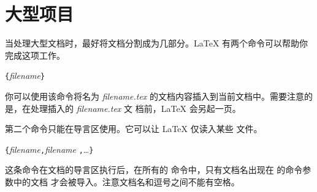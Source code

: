 %
%



%

\section{大型项目}

当处理大型文档时，最好将文档分割成为几部分。\LaTeX{} 有两个命令可以帮助你完成这项工作。

\begin{lscommand}
\verb|{|\emph{filename}\verb|}|
\end{lscommand}
\noindent %
你可以使用该命令将名为 \emph{filename.tex} 的文档内容插入到当前文档中。需要注意的是，在处理插入的 \emph{filename.tex} 文
档前，\LaTeX{} 会另起一页。


第二个命令只能在导言区使用。它可以让 \LaTeX{} 仅读入某些 \verb|| 文件。
\begin{lscommand}
\verb|{|\emph{filename}\verb|,|\emph{filename}%
\verb|,|\ldots\verb|}|
\end{lscommand}
这条命令在文档的导言区执行后，在所有的  命令中，只有文档名出现在  的命令参数中的文档
才会被导入。注意文档名和逗号之间不能有空格。


